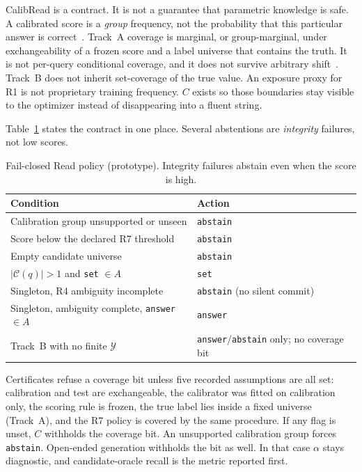 \documentclass[sigconf, nonacm]{acmart}
\begin{document}
CalibRead is a contract. It is not a guarantee that parametric knowledge is safe. A calibrated score is a \emph{group} frequency, not the probability that this particular answer is correct~\cite{kalai2024calibrated}. Track~A coverage is marginal, or group-marginal, under exchangeability of a frozen score and a label universe that contains the truth. It is not per-query conditional coverage, and it does not survive arbitrary shift~\cite{tibshirani2019weighted}. Track~B does not inherit set-coverage of the true value. An exposure proxy for R1 is not proprietary training frequency. $C$ exists so those boundaries stay visible to the optimizer instead of disappearing into a fluent string.

Table~\ref{tab:failclosed} states the contract in one place. Several abstentions are \emph{integrity} failures, not low scores.

\begin{table}[t]
\caption{Fail-closed Read policy (prototype). Integrity failures abstain even when the score is high.}
\label{tab:failclosed}
\small
\setlength{\tabcolsep}{3pt}
\begin{tabular}{@{}>{\raggedright\arraybackslash}p{}
                >{\raggedright\arraybackslash}p{}@{}}
\toprule
Condition & Action \\
\midrule
Calibration group unsupported or unseen & \texttt{abstain} \\
Score below the declared R7 threshold & \texttt{abstain} \\
Empty candidate universe & \texttt{abstain} \\
$|\mathcal{C}(q)|>1$ and \texttt{set} $\in A$ & \texttt{set} \\
Singleton, R4 ambiguity incomplete & \texttt{abstain} (no silent commit) \\
Singleton, ambiguity complete, \texttt{answer} $\in A$ & \texttt{answer} \\
Track~B with no finite $\mathcal{Y}$ & \texttt{answer}/\texttt{abstain} only; no coverage bit \\
\bottomrule
\end{tabular}
\end{table}

Certificates refuse a coverage bit unless five recorded assumptions are all set: calibration and test are exchangeable, the calibrator was fitted on calibration only, the scoring rule is frozen, the true label lies inside a fixed universe (Track~A), and the R7 policy is covered by the same procedure. If any flag is unset, $C$ withholds the coverage bit. An unsupported calibration group forces \texttt{abstain}. Open-ended generation withholds the bit as well. In that case $\alpha$ stays diagnostic, and candidate-oracle recall is the metric reported first.
\end{document}
